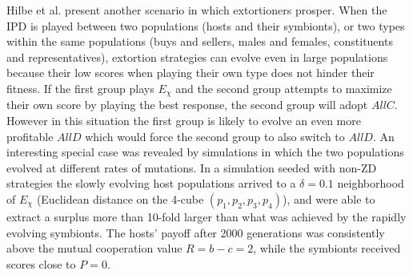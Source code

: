 Hilbe et al. present another scenario in which extortioners prosper. When the IPD is played between two populations (hosts and their symbionts), or two types within the same populations (buys and sellers, males and females, constituents and representatives), extortion strategies can evolve even in large populations because their low scores when playing their own type does not hinder their fitness. If the first group plays $E_\chi$ and the second group attempts to maximize their own score by playing the best response, the second group will adopt $AllC$. However in this situation the first group is likely to evolve an even more profitable $AllD$ which would force the second group to also switch to $AllD$. An interesting special case was revealed by simulations in which the two populations evolved at different rates of mutations. In a simulation seeded with non-ZD strategies the slowly evolving host populations arrived to a $\delta = 0.1$ neighborhood of $E_\chi$ (Euclidean distance on the 4-cube $(p_1, p_2, p_3, p_4)$), and were able to extract a surplus more than 10-fold larger than what was achieved by the rapidly evolving symbionts. The hosts' payoff after 2000 generations was consistently above the mutual cooperation value $R = b-c = 2$, while the symbionts received scores close to $P = 0$.

